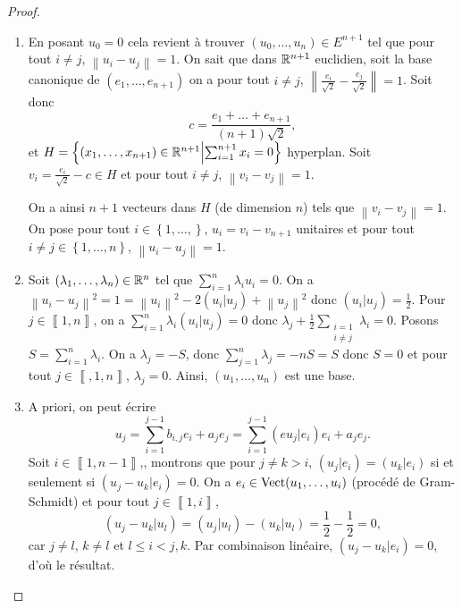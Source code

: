 \documentclass[12pt]{article}
\begin{document}
\begin{proof}
	\phantom{}
	\begin{enumerate}
		\item En posant $u_0=0$ cela revient à trouver $(u_0,\dots,u_n)\in E^{n+1}$ tel que pour tout $i\neq j$, $\left\lVert u_i-u_j\right\rVert=1$. On sait que dans $\mathbb{R}^{n+1}$ euclidien, soit la base canonique de $(e_1,\dots,e_{n+1})$ on a pour tout $i\neq j$, $\left\lVert\frac{e_i}{\sqrt{2}}-\frac{e_j}{\sqrt{2}}\right\rVert=1$. Soit donc 
		\begin{equation}
			c=\frac{e_1+\dots+e_{n+1}}{(n+1)\sqrt{2}},
		\end{equation}
		et $H=\left\lbrace(x_1,\dots,x_{n+1})\in\mathbb{R}^{n+1}\middle|\sum_{i=1}^{n+1}x_i=0\right\rbrace$ hyperplan. Soit $v_i=\frac{e_i}{\sqrt{2}}-c\in H$ et pour tout $i\neq j$, $\left\lVert v_i-v_j\right\rVert=1$.

		On a ainsi $n+1$ vecteurs dans $H$ (de dimension $n$) tels que $\left\lVert v_i-v_j\right\rVert=1$. On pose pour tout $i\in\left\lbrace1,\dots,\right\rbrace$, $u_i=v_i-v_{n+1}$ unitaires et pour tout $i\neq j\in\left\lbrace1,\dots,n\right\rbrace$, $\left\lVert u_i-u_j\right\rVert=1$.

		\item Soit $(\lambda_1,\dots,\lambda_n)\in\mathbb{R}^{n}$ tel que $\sum_{i=1}^{n}\lambda_i u_i=0$. On a $\left\lVert u_i-u_j\right\rVert^{2}=1=\left\lVert u_i\right\rVert^{2}-2(u_i|u_j)+\left\lVert u_j\right\rVert^{2}$ donc $(u_i|u_j)=\frac{1}{2}$. Pour $j\in\left\llbracket1,n\right\rrbracket$, on a $\sum_{i=1}^{n}\lambda_i(u_i|u_j)=0$ donc $\lambda_j+\frac{1}{2}\sum_{\substack{i=1\\i\neq j}}\lambda_i=0$.
		Posons $S=\sum_{i=1}^{n}\lambda_i$. On a $\lambda_j=-S$, donc $\sum_{j=1}^{n}\lambda_j=-nS=S$ donc $S=0$ et pour tout $j\in\left\llbracket,1,n\right\rrbracket$, $\lambda_j=0$. Ainsi, $(u_1,\dots,u_n)$ est une base.

		\item A priori, on peut écrire 
		\begin{equation}
			u_j=\sum_{i=1}^{j-1}b_{i,j}e_i+a_{j}e_{j}=\sum_{i=1}^{j-1}(eu_j|e_i)e_i+a_{j}e_j.
		\end{equation}
		Soit $i\in\left\llbracket1,n-1\right\rrbracket$,, montrons que pour $j\neq k>i$, $(u_j|e_i)=(u_k|e_i)$ si et seulement si $(u_j-u_k|e_i)=0$. On a $e_i\in\operatorname{Vect}(u_1,\dots,u_i)$ (procédé de Gram-Schmidt) et pour tout $j\in\left\llbracket1,i\right\rrbracket$, 
		\begin{equation}
			(u_j-u_k|u_l)=(u_j|u_l)-(u_k|u_l)=\frac{1}{2}-\frac{1}{2}=0,
		\end{equation}
		car $j\neq l$, $k\neq l$ et $l\leqslant i<j,k$. Par combinaison linéaire, $(u_j-u_k|e_i)=0$, d'où le résultat.
	\end{enumerate}
\end{proof}
\end{document}
